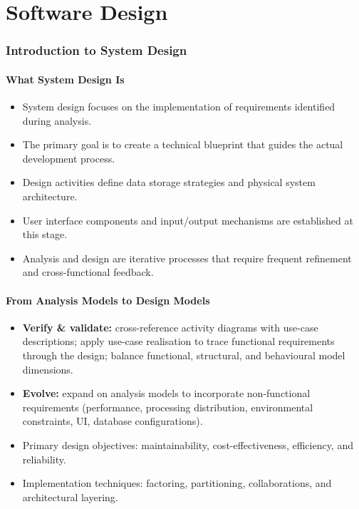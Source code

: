\documentclass[hidelinks]{article}
\begin{document}
\part{Software Design}
\section{Introduction to System Design}

\subsection{What System Design Is}
\begin{itemize}
  \item System design focuses on the implementation of requirements identified during analysis.
  \item The primary goal is to create a technical blueprint that guides the actual development process.
  \item Design activities define data storage strategies and physical system architecture.
  \item User interface components and input/output mechanisms are established at this stage.
  \item Analysis and design are iterative processes that require frequent refinement and cross-functional feedback.
\end{itemize}

\subsection{From Analysis Models to Design Models}
\begin{itemize}
  \item \textbf{Verify \& validate:} cross-reference activity diagrams with use-case descriptions;
        apply use-case realisation to trace functional requirements through the design; balance
        functional, structural, and behavioural model dimensions.
  \item \textbf{Evolve:} expand on analysis models to incorporate non-functional requirements
        (performance, processing distribution, environmental constraints, UI, database configurations).
  \item Primary design objectives: maintainability, cost-effectiveness, efficiency, and reliability.
  \item Implementation techniques: factoring, partitioning, collaborations, and architectural layering.
\end{itemize}
\end{document}
